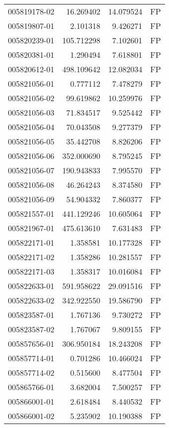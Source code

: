 \begin{tabular}{lrrl}
005819178-02 &   16.269402 &    14.079524 &   FP \\
005819807-01 &    2.101318 &     9.426271 &   FP \\
005820239-01 &  105.712298 &     7.102601 &   FP \\
005820381-01 &    1.290494 &     7.618801 &   FP \\
005820612-01 &  498.109642 &    12.082034 &   FP \\
005821056-01 &    0.777112 &     7.478279 &   FP \\
005821056-02 &   99.619862 &    10.259976 &   FP \\
005821056-03 &   71.834517 &     9.525442 &   FP \\
005821056-04 &   70.043508 &     9.277379 &   FP \\
005821056-05 &   35.442708 &     8.826206 &   FP \\
005821056-06 &  352.000690 &     8.795245 &   FP \\
005821056-07 &  190.943833 &     7.995570 &   FP \\
005821056-08 &   46.264243 &     8.374580 &   FP \\
005821056-09 &   54.904332 &     7.860377 &   FP \\
005821557-01 &  441.129246 &    10.605064 &   FP \\
005821967-01 &  475.613610 &     7.631483 &   FP \\
005822171-01 &    1.358581 &    10.177328 &   FP \\
005822171-02 &    1.358286 &    10.281557 &   FP \\
005822171-03 &    1.358317 &    10.016084 &   FP \\
005822633-01 &  591.958622 &    29.091516 &   FP \\
005822633-02 &  342.922550 &    19.586790 &   FP \\
005823587-01 &    1.767136 &     9.730272 &   FP \\
005823587-02 &    1.767067 &     9.809155 &   FP \\
005857656-01 &  306.950184 &    18.243208 &   FP \\
005857714-01 &    0.701286 &    10.466024 &   FP \\
005857714-02 &    0.515600 &     8.477504 &   FP \\
005865766-01 &    3.682004 &     7.500257 &   FP \\
005866001-01 &    2.618484 &     8.440532 &   FP \\
005866001-02 &    5.235902 &    10.190388 &   FP \\

\end{tabular}
